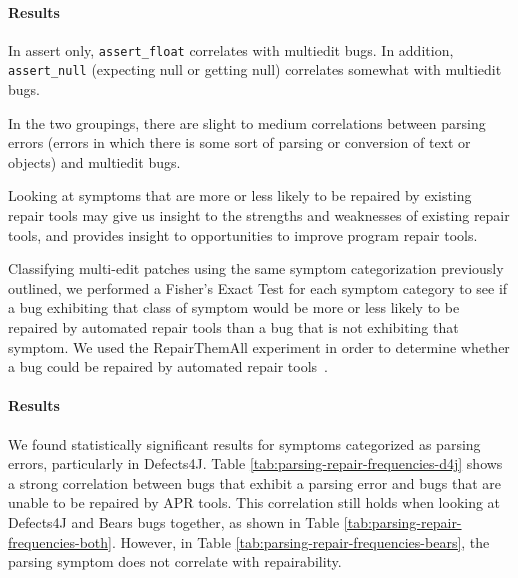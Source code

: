 \paragraph{Results}
In assert only, \lstinline{assert_float} correlates with multiedit bugs. In addition, \lstinline{assert_null} (expecting null or getting null) correlates somewhat with multiedit bugs.

In the two groupings, there are slight to medium correlations between parsing errors (errors in which there is some sort of parsing or conversion of text or objects) and multiedit bugs.


Looking at symptoms that are more or less likely to be repaired by existing repair tools may give us 
insight to the strengths and weaknesses of existing repair tools, and provides insight to opportunities 
to improve program repair tools.

Classifying multi-edit patches using the same symptom categorization previously outlined, we 
performed a Fisher's Exact Test for each symptom category to see if a bug exhibiting that class of 
symptom would be more or less likely to be repaired by automated repair tools than a bug that is not 
exhibiting that symptom. We used the RepairThemAll experiment in order to determine whether a 
bug could be repaired by automated repair tools~\cite{durieux-repair-them-all}.

\paragraph{Results}
We found statistically significant results for symptoms categorized as parsing errors, particularly in 
Defects4J. Table \ref{tab:parsing-repair-frequencies-d4j} shows a strong correlation between bugs 
that exhibit a parsing error and bugs that are unable to be repaired by APR tools. This correlation 
still holds when looking at Defects4J and Bears bugs together, as shown in Table 
\ref{tab:parsing-repair-frequencies-both}. However, in Table 
\ref{tab:parsing-repair-frequencies-bears}, the parsing symptom does not correlate with 
repairability. 


